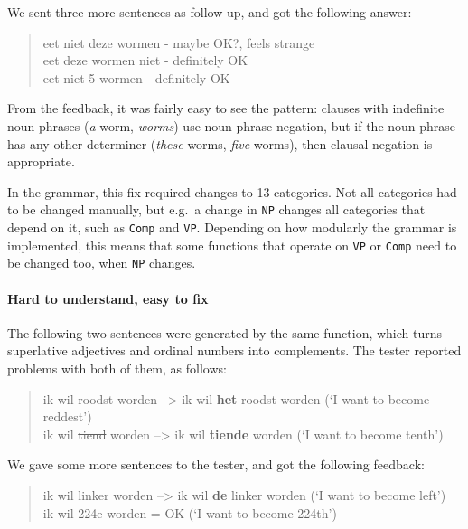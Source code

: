\noindent We sent three more sentences as follow-up, and got the
following answer:

\begin{quote}
eet niet deze wormen - maybe OK?, feels strange\\eet deze wormen niet -
definitely OK\\eet niet 5 wormen - definitely OK
\end{quote}

\noindent From the feedback, it was fairly easy to see the pattern:
clauses with indefinite noun phrases (\emph{a} worm, \emph{worms}) use
noun phrase negation, but if the noun phrase has any other determiner
(\emph{these} worms, \emph{five} worms), then clausal negation is
appropriate.

In the grammar, this fix required changes to 13 categories. Not all
categories had to be changed manually, but e.g.~a change in \texttt{NP}
changes all categories that depend on it, such as \texttt{Comp} and
\texttt{VP}. Depending on how modularly the grammar is implemented, this
means that some functions that operate on \texttt{VP} or \texttt{Comp}
need to be changed too, when \texttt{NP} changes.

\paragraph{Hard to understand, easy to fix}\label{hard-to-understand-easy-to-fix}

The following two sentences were generated by the same function, which
turns superlative adjectives and ordinal numbers into complements. The
tester reported problems with both of them, as follows:

\begin{quote}
ik wil roodst worden --\textgreater{} ik wil \textbf{het} roodst worden
(`I want to become reddest')\\ik wil \sout{tiend} worden
--\textgreater{} ik wil \textbf{tiende} worden (`I want to become
tenth')
\end{quote}

\noindent We gave some more sentences to the tester, and got the following
feedback:

\begin{quote}
ik wil linker worden --\textgreater{} ik wil \textbf{de} linker worden
(`I want to become left')\\ik wil 224e worden = OK (`I want to become
224th')
\end{quote}

